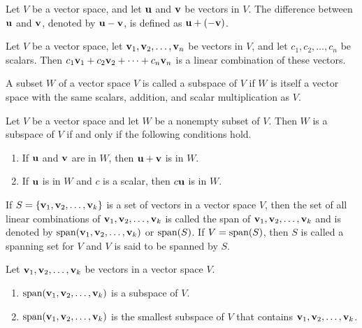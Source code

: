 \documentclass[../m73main.tex]{chapters}
\begin{document}
\begin{definition}
	Let $V$ be a vector space, and let $\mathbf{u}$ and $\mathbf{v}$ be vectors in $V$.
	The difference between $\mathbf{u}$ and $\mathbf{v}$, denoted by $\mathbf{u} - \mathbf{v}$, is defined as $\mathbf{u} + (-\mathbf{v})$.
\end{definition}

\begin{definition}
	Let $V$ be a vector space, let $\mathbf{v}_1, \mathbf{v}_2, \ldots, \mathbf{v}_n$ be vectors in $V$, and let $c_1, c_2, \ldots, c_n$ be scalars.
	Then $c_1\mathbf{v}_1 + c_2\mathbf{v}_2 + \cdots + c_n \mathbf{v}_n$ is a linear combination of these vectors.
\end{definition}

\begin{definition}[Subspace]
	A subset $W$ of a vector space $V$ is called a subspace of $V$ if $W$ is itself a vector space with the same scalars, addition, and scalar multiplication as $V$.
\end{definition}

\begin{theorem}
	Let $V$ be a vector space and let $W$ be a nonempty subset of $V$.
	Then $W$ is a subspace of $V$ if and only if the following conditions hold.
	\begin{enumerate}[label=(\alph*)]
		\item If $\mathbf{u}$ and $\mathbf{v}$ are in $W$, then $\mathbf{u} + \mathbf{v}$ is in $W$.
		\item If $\mathbf{u}$ is in $W$ and $c$ is a scalar, then $c \mathbf{u}$ is in $W$.
	\end{enumerate}
\end{theorem}

\begin{definition}[Span]
	If $S = \{\mathbf{v}_1, \mathbf{v}_2, \ldots, \mathbf{v}_{k}\}$ is a set of vectors in a vector space $V$, then the set of all linear combinations of $\mathbf{v}_1, \mathbf{v}_2, \ldots, \mathbf{v}_k$ is called the span of $\mathbf{v}_1, \mathbf{v}_2, \ldots, \mathbf{v}_k$ and is denoted by $\textrm{span}(\mathbf{v}_1, \mathbf{v}_2, \ldots, \mathbf{v}_k)$ or $\textrm{span}(S)$.
	If $V = \textrm{span}(S)$, then $S$ is called a spanning set for $V$ and $V$ is said to be spanned by $S$.
\end{definition}

\begin{theorem}
	Let $\mathbf{v}_1, \mathbf{v}_2, \ldots, \mathbf{v}_k$ be vectors in a vector space $V$.
	\begin{enumerate}[label=(\alph*)]
		\item $\textrm{span}(\mathbf{v}_1, \mathbf{v}_2, \ldots, \mathbf{v}_k)$ is a subspace of $V$.
		\item $\textrm{span}(\mathbf{v}_1, \mathbf{v}_2, \ldots, \mathbf{v}_k)$ is the smallest subspace of $V$ that contains $\mathbf{v}_1, \mathbf{v}_2, \ldots, \mathbf{v}_k$.
	\end{enumerate}
\end{theorem}
\end{document}
